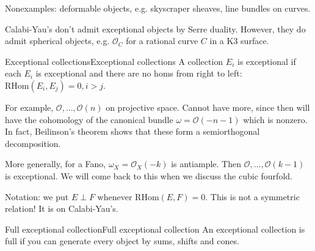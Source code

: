 Nonexamples: deformable objects, e.g. skyscraper sheaves, line bundles on curves.

\begin{remark}
    Calabi-Yau's don't admit exceptional objects by Serre duality. However, they do admit spherical objects, e.g. $\mathcal{O}_C$ for a rational curve $C$ in a K3 surface.
\end{remark}

\begin{definition}{Exceptional collections}{Exceptional collections}
    A collection $E_i$ is exceptional if each $E_i$ is exceptional and there are no homs from right to left: $\mathrm{RHom}(E_{i}, E_{j})=0, i>j$.
\end{definition}


For example, $\mathcal{O},\dots,\mathcal{O}(n)$ on projective space. Cannot have more, since then will have the cohomology of the canonical bundle $\omega=\mathcal{O}(-n-1)$ which is nonzero. In fact, Beilinson's theorem shows that these form a semiorthogonal decomposition.

More generally, for a Fano, $\omega_{X}=\mathcal{O}_{X}(-k)$ is antiample. Then $\mathcal{O}, \dots, \mathcal{O}(k-1)$ is exceptional. We will come back to this when we discuss the cubic fourfold.


Notation: we put $E \perp F$ whenever $\mathrm{RHom}(E,F)=0$. This is not a symmetric relation! It is on Calabi-Yau's. 

\begin{definition}{Full exceptional collection}{Full exceptional collection}
    An exceptional collection is full if you can generate every object by sums, shifts and cones.

\end{definition}

